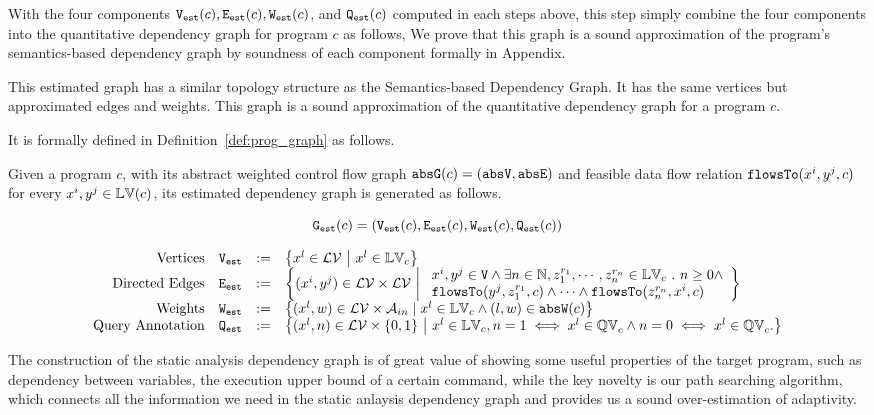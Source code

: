 With the four components $\mathtt{{V_{est}}}(c), \mathtt{{E_{est}}}(c), \mathtt{{W_{est}}}(c)$, and $\mathtt{{Q_{est}}}(c)$
computed in each steps above, this step simply combine the four components into the quantitative dependency graph for program $c$ as follows,
%
\highlight{
  \[
    \progG(c) = (\progV(c), \progE(c), \progW(c), \progF(c)).
    \]
}
We prove that this graph is a sound approximation of the program's semantics-based dependency graph by soundness of each component formally in Appendix.

This estimated graph has a similar topology structure as 
the Semantics-based Dependency Graph. It has the same
vertices 
but approximated edges and weights.  
This graph is a sound approximation of the quantitative dependency graph for a program $c$.

It is formally defined in Definition~\ref{def:prog_graph} as follows.

\begin{defn}
\label{def:prog_graph}
Given a program $c$, with its abstract weighted control flow graph $\mathtt{abs}{\mathtt{G}}(c) = (\mathtt{abs}{\mathtt{V}}, \mathtt{abs}{\mathtt{E}})$ and 
feasible data flow relation $\mathtt{flowsTo}(x^i, y^j, c)$ for every $x^i, y^j \in \mathbb{LV}(c)$, its estimated dependency graph
is generated as follows.

\[\mathtt{{G_{est}}}(c) = (\mathtt{{V_{est}}}(c), \mathtt{{E_{est}}}(c), \mathtt{{W_{est}}}(c), \mathtt{{Q_{est}}}(c))\]

{
\[
\begin{array}{rlcl}
\text{Vertices} &
\progV & := & \left\{ 
x^l \in \mathcal{LV} 
~ \middle\vert ~
x^l \in \lvar_{c}
\right\}
\\
\text{Directed Edges} &
\progE & := & 
\left\{ 
(x^i, y^j) \in \mathcal{LV} \times \mathcal{LV}
~ \middle\vert ~
\begin{array}{l}
x^i, y^j \in \vertxs
\land
\exists n \in \mathbb{N}, z_1^{r_1}, \cdots, z_n^{r_n} \in \lvar_{{c}} \sthat
n \geq 0 \land
\\
\flowsto(y^j,  z_1^{r_1}, c) 
\land \cdots \land \flowsto(z_n^{r_n}, x^i, c) 
\end{array}
\right\}
\\
\text{Weights} &
\progW & := &
\left\{ (x^l, w) \in  \mathcal{LV} \times \mathcal{A}_{in}
\mid
x^l \in \lvar_{{c}} \land (l, w) \in \absW(c)
\right\}
\\
\text{Query Annotation} &
\progF & := & 
\left\{(x^l, n)  \in  \mathcal{LV} \times \{0, 1\} 
~ \middle\vert ~
x^l \in \lvar_{c},
n = 1 \iff x^l \in \qvar_{c} \land n = 0 \iff  x^l \in \qvar_{c} .
\right\}
\end{array}
\] }
\end{defn}
The construction of the static analysis dependency graph is of great value of showing some useful properties of the target program,
such as dependency between variables, the execution upper bound of a certain command,
while the key novelty is our path searching algorithm, which connects all the information we need in the static anlaysis dependency graph and provides us a sound over-estimation of adaptivity.
